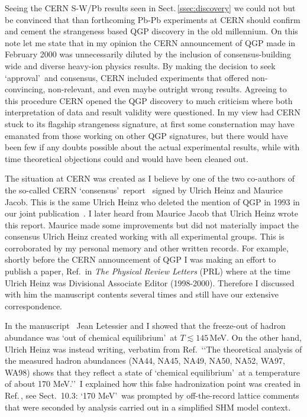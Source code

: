 \documentclass{appolb}
\begin{document}
Seeing the CERN S-W/Pb results seen in Sect.\,\ref{ssec:discovery} we could not but be convinced that than forthcoming Pb-Pb experiments at CERN should confirm and cement the strangeness based QGP discovery in the old millennium. On this note let me state that in my opinion the CERN announcement of QGP made in February 2000 was unnecessarily diluted by the inclusion of consensus-building wide and diverse heavy-ion physics results. By making the decision to seek \lq approval\rq\ and consensus, CERN included experiments that offered non-convincing, non-relevant, and even maybe outright wrong results. Agreeing to this procedure CERN opened the QGP discovery to much criticism where both interpretation of data and result validity were questioned. In my view had CERN stuck to its flagship strangeness signature, at first some consternation may have emanated from those working on other QGP signatures, but there would have been few if any doubts possible about the actual experimental results, while with time theoretical objections could and would have been cleaned out.

The situation at CERN was created as I believe by one of the two co-authors of the so-called CERN \lq consensus\rq\ report~\cite{Heinz:2000bk} signed by Ulrich Heinz and Maurice Jacob. This is the same Ulrich Heinz who deleted the mention of QGP in 1993 in our joint publication~\cite{Sollfrank:1993wn}. I later heard from Maurice Jacob that Ulrich Heinz wrote this report. Maurice made some improvements but did not materially impact the consensus Ulrich Heinz created working with all experimental groups. This is corroborated by my personal memory and other written records. For example, shortly before the CERN announcement of QGP I was making an effort to publish a paper, Ref.\,\cite{Rafelski:1999xv} in {\it The Physical Review Letters} (PRL) where at the time Ulrich Heinz was Divisional Associate Editor (1998-2000). Therefore I discussed with him the manuscript contents several times and still have our extensive correspondence.

In the manuscript~\cite{Rafelski:1999xv} Jean Letessier and I showed that the freeze-out of hadron abundance was \lq out of chemical equilibrium\rq\ at $T\lesssim 145$\,MeV. On the other hand, Ulrich Heinz was instead writing, verbatim from Ref.\,\cite{Heinz:2000bk} \lq\lq The theoretical analysis of the measured hadron abundances (NA44, NA45, NA49, NA50, NA52, WA97, WA98) shows that they reflect a state of \lq chemical equilibrium\rq\ at a temperature of about 170 MeV.\rq\rq\ I explained how this false hadronization point was created in Ref.\,\cite{Rafelski:2015cxa}, see Sect.~10.3\;: \lq 170 MeV\rq\ was prompted by off-the-record lattice comments that were seconded by analysis carried out in a simplified SHM model context.
\end{document}
